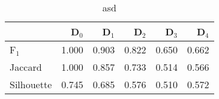 \begin{table}
\centering
\caption{asd}
\label{tab:s1-cont-eca-single}
\begin{tabular}{lrrrrr}
\toprule
{} &  D$_0$ &  D$_1$ &  D$_2$ &  D$_3$ &  D$_4$ \\
\midrule
F$_1$      &  1.000 &  0.903 &  0.822 &  0.650 &  0.662 \\
Jaccard    &  1.000 &  0.857 &  0.733 &  0.514 &  0.566 \\
Silhouette &  0.745 &  0.685 &  0.576 &  0.510 &  0.572 \\
\bottomrule
\end{tabular}
\end{table}
